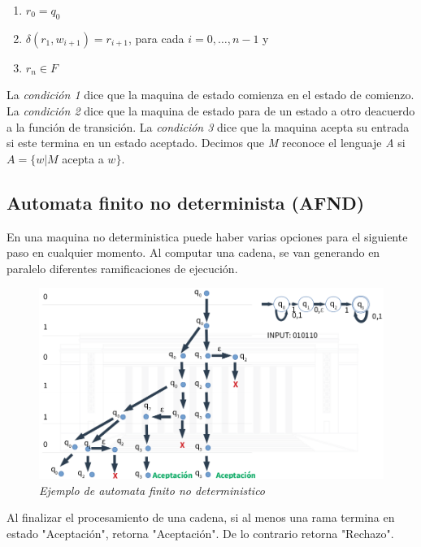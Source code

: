 \documentclass{article}
\begin{document}
\begin{enumerate}
    \item \(r_0=q_0\)
    \item \(\delta(r_1, w_{i+1})=r_{i+1}\), para cada \(i=0,\dots,n-1\) y
    \item \(r_n \in F\)
\end{enumerate}

La \textit{condición 1} dice que la maquina de estado comienza en el estado de comienzo. La \textit{condición 2} dice que la maquina de estado para de un estado a otro deacuerdo a la función de transición.
La \textit{condición 3} dice que la maquina acepta su entrada si este termina en un estado aceptado. 
Decimos que \textit{M} reconoce el lenguaje \textit{A} si \(A=\{w | M\) acepta a \(w \}\).

\newpage
\subsection{Automata finito no determinista (AFND)}

En una maquina no deterministica puede haber varias opciones para el siguiente paso en cualquier momento.
Al computar una cadena, se van generando en paralelo diferentes ramificaciones de ejecución.

\begin{figure}[h!]
    \begin{center} 
    \includegraphics[width=\linewidth]{imagenes/ejemplo_AFND.png}
    \caption{\small \sl Ejemplo de automata finito no deterministico} 
    \end{center}
\end{figure}

Al finalizar el procesamiento de una cadena, si al menos una rama termina en estado "Aceptación", retorna "Aceptación".
De lo contrario retorna "Rechazo".
\end{document}
